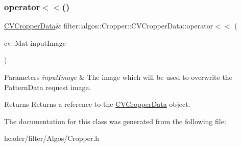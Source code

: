 \subsubsection{\texorpdfstring{operator$<$$<$()}{operator<<()}\hspace{0.1cm}{\footnotesize\ttfamily [2/2]}}
{\footnotesize\ttfamily \hyperlink{classfilter_1_1algos_1_1_cropper_1_1_c_v_cropper_data}{C\+V\+Cropper\+Data}\& filter\+::algos\+::\+Cropper\+::\+C\+V\+Cropper\+Data\+::operator$<$$<$ (\begin{DoxyParamCaption}\item[{cv\+::\+Mat}]{input\+Image }\end{DoxyParamCaption})\hspace{0.3cm}{\ttfamily [inline]}}


\begin{DoxyParams}{Parameters}
{\em input\+Image} & The image which will be used to overwrite the Pattern\+Data request image. \\
\hline
\end{DoxyParams}
\begin{DoxyReturn}{Returns}
Returns a reference to the \hyperlink{classfilter_1_1algos_1_1_cropper_1_1_c_v_cropper_data}{C\+V\+Cropper\+Data} object. 
\end{DoxyReturn}


The documentation for this class was generated from the following file\+:\begin{DoxyCompactItemize}
\item 
header/filter/\+Algos/Cropper.\+h\end{DoxyCompactItemize}
